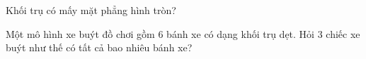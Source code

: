 \begin{ex} %
Khối trụ có mấy mặt phẳng hình tròn?
\end{ex}

\begin{ex} %
Một mô hình xe buýt đồ chơi gồm 6 bánh xe có dạng khối trụ dẹt. Hỏi 3 chiếc xe buýt như thế có tất cả bao nhiêu bánh xe?
\end{ex}
